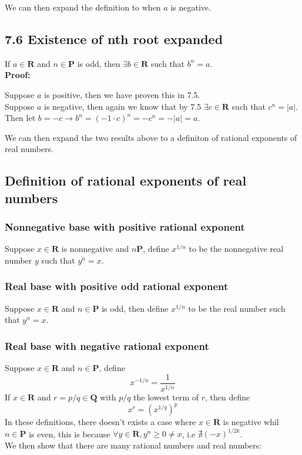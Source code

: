 \documentclass{article}
\begin{document}
We can then expand the definition to when $a$ is negative.
\subsection*{7.6 Existence of nth root expanded}
If $a \in \mathbf{R}$ and $n \in \mathbf{P}$ is odd, then $\exists b \in \mathbf{R}$ such that $b^n = a$.\\
\textbf{Proof:}
\begin{addmargin}[1em]{0em}
    Suppose $a$ is positive, then we have proven this in 7.5.\\
    Suppose $a$ is negative, then again we know that by 7.5 $\exists c \in \mathbf{R}$ such that $c^n = |a|$.\\
    Then let $b = -c \rightarrow b^n = (-1\cdot c)^n = -c^n = -|a| = a$.
\end{addmargin}
We can then expand the two results above to a definiton of rational exponents of real numbers.
\subsection*{Definition of rational exponents of real numbers}
\subsubsection*{Nonnegative base with positive rational exponent}
Suppose $x \in \mathbf{R}$ is nonnegative and $n \mathbf{P}$, define $x^{1/n}$ to be the nonnegative real number $y$ such that $y^n = x$.
\subsubsection*{Real base with positive odd rational exponent}
Suppose $x \in \mathbf{R}$ and $n \in \mathbf{P}$ is odd, then define $x^{1/n}$ to be the real number such that $y^n = x$.
\subsubsection*{Real base with negative rational exponent}
Suppose $x \in \mathbf{R}$ and $n \in \mathbf{P}$, define
\begin{equation*}
    x^{-1/n} = \frac{1}{x^{1/n}}
\end{equation*}
If $x \in \mathbf{R}$ and $r = p/q \in \mathbf{Q}$ with $p/q$ the lowest term of $r$, then define
\begin{equation*}
    x^r = (x^{1/q})^p
\end{equation*}
In these definitions, there doesn't exists a case where $x \in \mathbf{R}$ is negative whil $n \in \mathbf{P}$ is even, this is because $\forall y \in \mathbf{R}, y^n \geq 0 \neq x$, i.e $\nexists (-x)^{1/2k}$.\\
We then show that there are many rational numbers and real numbers:
\end{document}
